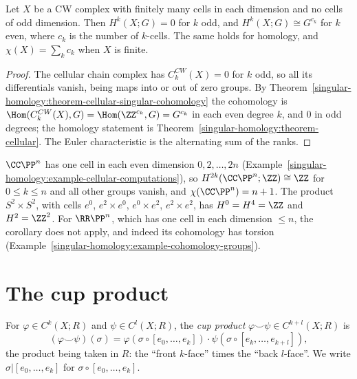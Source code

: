 \begin{corollary}\label{singular-homology:corollary-even-cells}
Let $X$ be a CW complex with finitely many cells in each dimension and no cells of odd dimension. Then $H^k(X; G) = 0$ for $k$ odd, and $H^k(X; G) \cong G^{c_k}$ for $k$ even, where $c_k$ is the
number of $k$-cells. The same holds for homology, and $\chi(X) = \sum_kc_k$ when $X$ is finite.
\end{corollary}

\begin{proof}
The cellular chain complex has $C^{CW}_k(X) = 0$ for $k$ odd, so all its differentials vanish, being maps into or out of zero groups. By Theorem~\ref{singular-homology:theorem-cellular-singular-cohomology} the cohomology is
$\Hom(C^{CW}_k(X), G) = \Hom(\ZZ^{c_k}, G) = G^{c_k}$ in each even degree $k$, and $0$ in odd degrees; the homology statement is Theorem~\ref{singular-homology:theorem-cellular}. The Euler characteristic is
the alternating sum of the ranks.
\end{proof}

\begin{example}\label{singular-homology:example-even-cells}
$\CC\PP^n$ has one cell in each even dimension $0, 2, \ldots, 2n$ (Example~\ref{singular-homology:example-cellular-computations}), so $H^{2k}(\CC\PP^n; \ZZ) \cong \ZZ$ for $0 \leq k \leq n$ and all other groups
vanish, and $\chi(\CC\PP^n) = n + 1$. The product $S^2 \times S^2$, with cells $e^0$, $e^2 \times e^0$, $e^0 \times e^2$, $e^2 \times e^2$, has $H^0 = H^4 = \ZZ$ and $H^2 = \ZZ^2$. For $\RR\PP^n$, which has one
cell in each dimension $\leq n$, the corollary does not apply, and indeed its cohomology has torsion (Example~\ref{singular-homology:example-cohomology-groups}).
\end{example}

\section{The cup product}\label{singular-homology:section-cup}

\begin{definition}\label{singular-homology:definition-cup}
For $\varphi \in C^k(X; R)$ and $\psi \in C^l(X; R)$, the \emph{cup product} $\varphi \smile \psi \in C^{k+l}(X; R)$ is
\[
(\varphi \smile \psi)(\sigma) = \varphi(\sigma \circ [e_0, \ldots, e_k]) \cdot \psi(\sigma \circ [e_k, \ldots, e_{k+l}]),
\]
the product being taken in $R$: the ``front $k$-face'' times the ``back $l$-face''. We write $\sigma|[e_0, \ldots, e_k]$ for $\sigma \circ [e_0, \ldots, e_k]$.
\end{definition}

